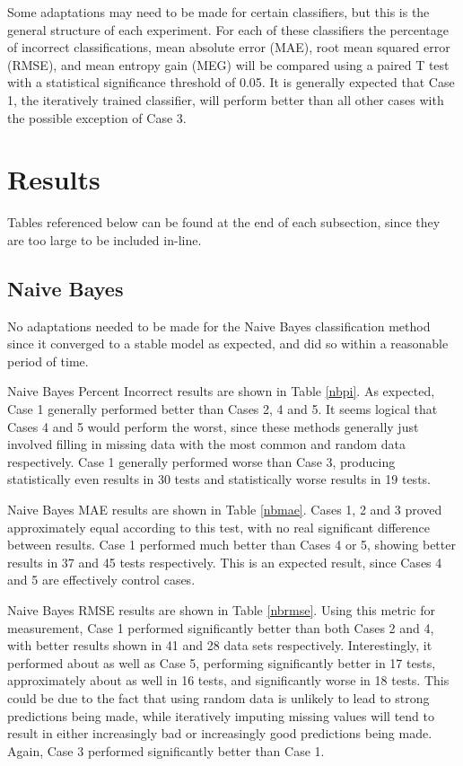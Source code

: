 Some adaptations may need to be made for certain classifiers, but this is the general structure of each experiment. For each of these classifiers the percentage of incorrect classifications, mean absolute error (MAE), root mean squared error (RMSE), and mean entropy gain (MEG) will be compared using a paired T test with a statistical significance threshold of 0.05. It is generally expected that Case 1, the iteratively trained classifier, will perform better than all other cases with the possible exception of Case 3.

\section{Results}

Tables referenced below can be found at the end of each subsection, since they are too large to be included in-line.

\subsection{Naive Bayes}
No adaptations needed to be made for the Naive Bayes classification method since it converged to a stable model as expected, and did so within a reasonable period of time.

Naive Bayes Percent Incorrect results are shown in Table \ref{nbpi}. As expected, Case 1 generally performed better than Cases 2, 4 and 5. It seems logical that Cases 4 and 5 would perform the worst, since these methods generally just involved filling in missing data with the most common and random data respectively. Case 1 generally performed worse than Case 3, producing statistically even results in 30 tests and statistically worse results in 19 tests.

Naive Bayes MAE results are shown in Table \ref{nbmae}. Cases 1, 2 and 3 proved approximately equal according to this test, with no real significant difference between results. Case 1 performed much better than Cases 4 or 5, showing better results in 37 and 45 tests respectively. This is an expected result, since Cases 4 and 5 are effectively control cases.

Naive Bayes RMSE results are shown in Table \ref{nbrmse}. Using this metric for measurement, Case 1 performed significantly better than both Cases 2 and 4, with better results shown in 41 and 28 data sets respectively. Interestingly, it performed about as well as Case 5, performing significantly better in 17 tests, approximately about as well in 16 tests, and significantly worse in 18 tests. This could be due to the fact that using random data is unlikely to lead to strong predictions being made, while iteratively imputing missing values will tend to result in either increasingly bad or increasingly good predictions being made. Again, Case 3 performed significantly better than Case 1.

